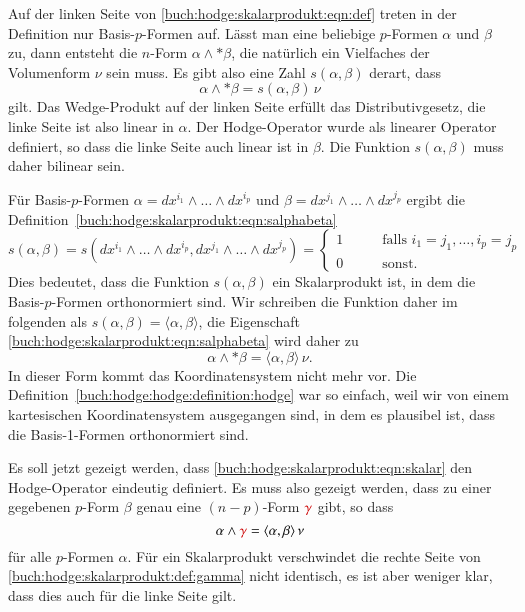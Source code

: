 Auf der linken Seite von \eqref{buch:hodge:skalarprodukt:eqn:def}
treten in der Definition nur Basis-$p$-Formen auf.
Lässt man eine beliebige $p$-Formen $\alpha$ und $\beta$ zu, dann
entsteht die $n$-Form $\alpha\wedge{\ast\beta}$, die natürlich ein
Vielfaches der Volumenform $\nu$ sein muss.
Es gibt also eine Zahl $s(\alpha,\beta)$ derart, dass
\begin{equation}
\alpha \wedge {\ast\beta} = s(\alpha,\beta)\,\nu
\label{buch:hodge:skalarprodukt:eqn:salphabeta}
\end{equation}
gilt.
Das Wedge-Produkt auf der linken Seite erfüllt das Distributivgesetz,
die linke Seite ist also linear in $\alpha$.
Der Hodge-Operator wurde als linearer Operator definiert, so dass 
die linke Seite auch linear ist in $\beta$.
Die Funktion $s(\alpha,\beta)$ muss daher bilinear sein.

Für Basis-$p$-Formen $\alpha=dx^{i_1}\wedge\dots\wedge dx^{i_p}$
und $\beta=dx^{j_1}\wedge\dots\wedge dx^{j_p}$ ergibt die
Definition~\eqref{buch:hodge:skalarprodukt:eqn:salphabeta}
\[
s(\alpha,\beta)
=
s(
dx^{i_1}\wedge\dots\wedge dx^{i_p},
dx^{j_1}\wedge\dots\wedge dx^{j_p}
)
=
\begin{cases}
1&\qquad\text{falls }i_1=j_1,\dots,i_p=j_p\\
0&\qquad\text{sonst.}
\end{cases}
\]
Dies bedeutet, dass die Funktion $s(\alpha,\beta)$ ein Skalarprodukt
ist, in dem die Basis-$p$-Formen orthonormiert sind.
Wir schreiben die Funktion daher im folgenden als
$s(\alpha,\beta)=\langle\alpha,\beta\rangle$, die Eigenschaft
\eqref{buch:hodge:skalarprodukt:eqn:salphabeta}
wird daher zu
\begin{equation}
\alpha\wedge {\ast\beta}
=
\langle\alpha,\beta\rangle\,\nu.
\label{buch:hodge:skalarprodukt:eqn:skalar}
\end{equation}
%
In dieser Form kommt das Koordinatensystem nicht mehr vor.
Die Definition~\ref{buch:hodge:hodge:definition:hodge}
war so einfach, weil wir von einem kartesischen Koordinatensystem
ausgegangen sind, in dem es plausibel ist, dass die Basis-1-Formen
orthonormiert sind.

Es soll jetzt gezeigt werden, dass
\eqref{buch:hodge:skalarprodukt:eqn:skalar}
den Hodge-Operator eindeutig definiert.
Es muss also gezeigt werden, dass zu einer gegebenen $p$-Form
$\beta$ genau eine $(n-p)$-Form ${\color{darkred}\gamma}$ gibt, so dass
\begin{equation}
\alpha\wedge {\color{darkred}\gamma}
=
\langle\alpha,\beta\rangle\,\nu
\label{buch:hodge:skalarprodukt:def:gamma}
\end{equation}
für alle $p$-Formen $\alpha$.
Für ein Skalarprodukt verschwindet die rechte
Seite von \eqref{buch:hodge:skalarprodukt:def:gamma}
nicht identisch, es ist aber weniger klar, dass dies auch für die
linke Seite gilt.

